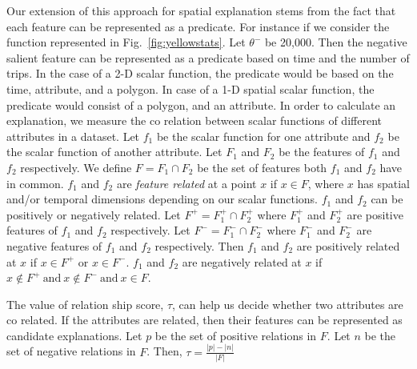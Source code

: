 Our extension of this approach for spatial explanation stems from the fact that each feature can be represented as a predicate. For instance if we consider the function represented in Fig.~\ref{fig:yellowstats}. Let $\theta^-$ be 20,000. Then the negative salient feature can be represented as a predicate based on time and the number of trips. In the case of a 2-D scalar function, the predicate would be based on the time, attribute, and a polygon. In case of a 1-D spatial scalar function, the predicate would consist of a polygon, and an attribute. In order to calculate an explanation, we measure the co relation between scalar functions of different attributes in a dataset. Let $f_1$ be the scalar function for one attribute and $f_2$ be the scalar function of another attribute. Let $F_1$ and $F_2$ be the features of $f_1$ and $f_2$ respectively. We define $F = F_1 \cap F_2$ be the set of features both $f_1$ and $f_2$ have in common. $f_1$ and $f_2$ are \textit{feature related} at a point $x$ if $x \in F$, where $x$ has spatial and/or temporal dimensions depending on our scalar functions. $f_1$ and $f_2$ can be positively or negatively related. Let $F^+ = F_1^+ \cap F_2^+$ where $F_1^+$ and $F_2^+$ are positive features of $f_1$ and $f_2$ respectively. Let $F^- = F_1^- \cap F_2^-$ where $F_1^-$ and $F_2^-$ are negative features of $f_1$ and $f_2$ respectively. Then $f_1$ and $f_2$ are positively related at $x$ if $x \in F^+$  or $x \in F^-$. $f_1$ and $f_2$ are negatively related at $x$ if $x \notin F^+\ \text{and}\ x \notin F^-\ \text{and}\ x\in F$. 

The value of relation ship score, $\tau$, can help us decide whether two attributes are co related. If the attributes are related, then their features can be represented as candidate explanations. Let $p$ be the set of positive relations in $F$. Let $n$ be the set of negative relations in $F$. Then,
$\tau = \frac{|p|-|n|}{|F|}$
